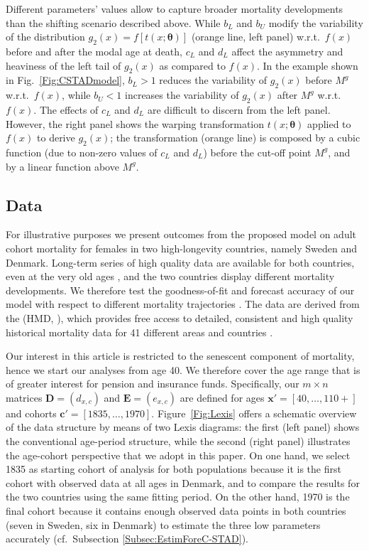 \documentclass[11pt, a4paper]{article}
\begin{document}
Different parameters' values allow to capture broader mortality developments than the shifting scenario described above. While $b_L$ and $b_U$ modify the variability of the distribution $g_2(x)=f\left[t(x;\bm{\theta})\right]$ (orange line, left panel) w.r.t.~$f(x)$ before and after the modal age at death, $c_L$ and $d_L$ affect the asymmetry and heaviness of the left tail of $g_2(x)$ as compared to $f(x)$. In the example shown in Fig.~\ref{Fig:CSTADmodel}, $b_L > 1$ reduces the variability of $g_2(x)$ before $M^g$ w.r.t.~$f(x)$, while $b_U < 1$ increases the variability of $g_2(x)$ after $M^g$ w.r.t.~$f(x)$. The effects of $c_L$ and $d_L$ are difficult to discern from the left panel. However, the right panel shows the warping transformation $t(x;\bm{\theta})$ applied to $f(x)$ to derive $g_2(x)$; the transformation (orange line) is composed by a cubic function (due to non-zero values of $c_L$ and $d_L$) before the cut-off point $M^g$, and by a linear function above $M^g$.

\subsection{Data}
\label{Subsec:Data}
For illustrative purposes we present outcomes from the proposed model on adult cohort mortality for females in two high-longevity countries, namely Sweden and Denmark. Long-term series of high quality data are available for both countries, even at the very old ages \citep{vaupel1994longer,wilmoth1996extreme,AndreevBookDanemark}, and the two countries display different mortality developments. We therefore test the goodness-of-fit and forecast accuracy of our model with respect to different mortality trajectories \citep{ChristensenEtAlDenmarkSwedenDivergence2010}. The data are derived from the \citeauthor{HMD} (HMD, \citeyear{HMD}), which provides free access to detailed, consistent and high quality historical mortality data for 41 different areas and countries \citep{barbieri2015data}.

Our interest in this article is restricted to the senescent component of mortality, hence we start our analyses from age 40. We therefore cover the age range that is of greater interest for pension and insurance funds. Specifically, {\color{red} our} $m \times n$ matrices $\bm{D} = (d_{x,c})$ and $\bm{E} = (e_{x,c})$ {\color{red} are defined for ages $\bm{x}'=\left[40,\dots,110+\right]$ and cohorts $\bm{c}'=\left[1835,\dots,1970\right]$}. Figure~\ref{Fig:Lexis} offers a schematic overview of the data structure by means of two Lexis diagrams: the first (left panel) shows the conventional age-period structure, while the second (right panel) illustrates the age-cohort perspective that we adopt in this paper. On one hand, we select 1835 as starting cohort of analysis for both populations because it is the first cohort with observed data at all ages in Denmark, and to compare the results for the two countries using the same fitting period. On the other hand, 1970 is the final cohort because it contains enough observed data points in both countries (seven in Sweden, six in Denmark) to estimate the three low parameters accurately (cf.~Subsection \ref{Subsec:EstimForeC-STAD}). 
\end{document}
